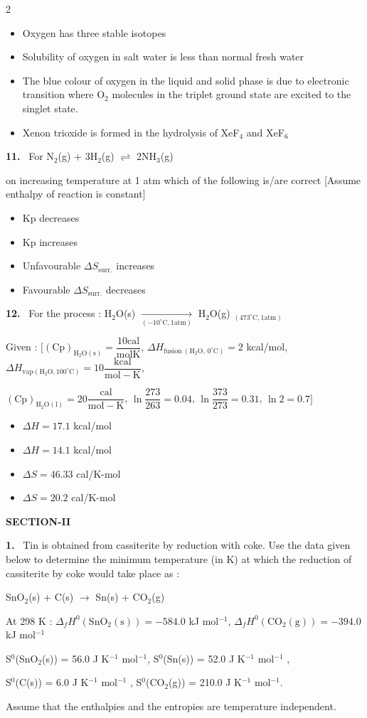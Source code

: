 \documentclass[10pt]{extarticle}
\newcommand{\sect}[1]{\par\smallskip\noindent\textbf{#1}\par}
\newcommand{\qn}[1]{\par\smallskip\noindent\textbf{#1.}~}
\newenvironment{qoptions}{\begin{itemize}[leftmargin=1.8em,itemsep=1pt,topsep=2pt,label={}]}{\end{itemize}}
\newcommand{\opt}[2]{\item[(#1)] #2}
\begin{document}
\begin{multicols}{2}
\begin{qoptions}
\opt{A}{Oxygen has three stable isotopes}
\opt{B}{Solubility of oxygen in salt water is less than normal fresh water}
\opt{C}{The blue colour of oxygen in the liquid and solid phase is due to electronic transition where O$_2$ molecules in the triplet ground state are excited to the singlet state.}
\opt{D}{Xenon trioxide is formed in the hydrolysis of XeF$_4$ and XeF$_6$}
\end{qoptions}
\qn{11} For N$_2$(g) + 3H$_2$(g) $\rightleftharpoons$ 2NH$_3$(g)\par
on increasing temperature at 1 atm which of the following is/are correct [Assume enthalpy of reaction is constant]
\begin{qoptions}
\opt{A}{Kp decreases}
\opt{B}{Kp increases}
\opt{C}{Unfavourable $\Delta S_{\mathrm{surr.}}$ increases}
\opt{D}{Favourable $\Delta S_{\mathrm{surr.}}$ decreases}
\end{qoptions}
\qn{12} For the process : H$_2$O(s) $\xrightarrow[(-10^\circ\mathrm C,1\mathrm{atm})]{}$ H$_2$O(g) $_{(473^\circ\mathrm C,1\mathrm{atm})}$\par
Given : $[(\mathrm{Cp})_{\mathrm{H_2O(s)}}=\dfrac{10\mathrm{cal}}{\mathrm{molK}}$, $\Delta H_{\mathrm{fusion\ (H_2O,\,0^\circ C)}}=2$ kcal/mol, $\Delta H_{\mathrm{vap(H_2O,100^\circ C)}}=10\dfrac{\mathrm{kcal}}{\mathrm{mol-K}}$,\par
$(\mathrm{Cp})_{\mathrm{H_2O(l)}}=20\dfrac{\mathrm{cal}}{\mathrm{mol-K}}$, $\ln\dfrac{273}{263}=0.04$, $\ln\dfrac{373}{273}=0.31$, $\ln2=0.7]$
\begin{qoptions}
\opt{A}{$\Delta H=17.1$ kcal/mol}
\opt{B}{$\Delta H=14.1$ kcal/mol}
\opt{C}{$\Delta S=46.33$ cal/K-mol}
\opt{D}{$\Delta S=20.2$ cal/K-mol}
\end{qoptions}
\sect{SECTION-II}
\qn{1} Tin is obtained from cassiterite by reduction with coke. Use the data given below to determine the minimum temperature (in K) at which the reduction of cassiterite by coke would take place as :\par
SnO$_2$(s) + C(s) $\to$ Sn(s) + CO$_2$(g)\par
At 298 K : $\Delta_f H^0(\mathrm{SnO_2(s)})=-584.0$ kJ mol$^{-1}$, $\Delta_f H^0(\mathrm{CO_2(g)})=-394.0$ kJ mol$^{-1}$\par
S$^0$(SnO$_2$(s)) = 56.0 J K$^{-1}$ mol$^{-1}$, S$^0$(Sn(s)) = 52.0 J K$^{-1}$ mol$^{-1}$ ,\par
S$^0$(C(s)) = 6.0 J K$^{-1}$ mol$^{-1}$ , S$^0$(CO$_2$(g)) = 210.0 J K$^{-1}$ mol$^{-1}$.\par
Assume that the enthalpies and the entropies are temperature independent.

\end{multicols}
\end{document}
